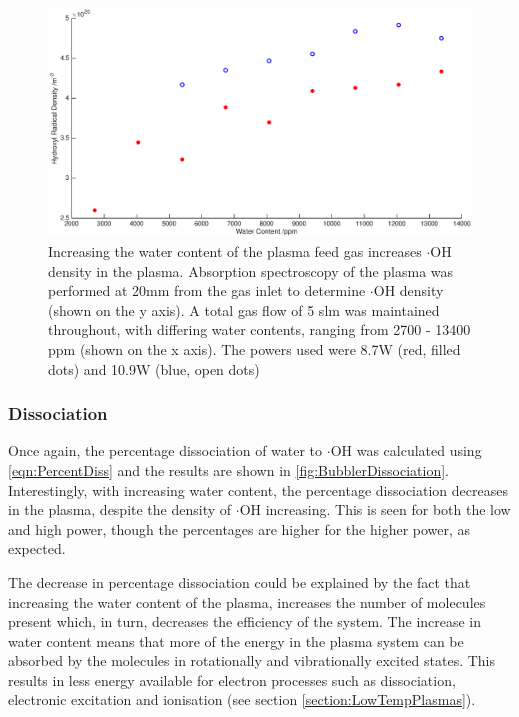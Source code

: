 \documentclass[11pt, oneside]{article}   	%
\begin{document}
\begin{figure}
    \centering
    \includegraphics[width=\textwidth]{Figures/BubblerVariation}
    \caption{Increasing the water content of the plasma feed gas increases $\cdot$OH density in the plasma. Absorption spectroscopy of the plasma was performed at 20mm from the gas inlet to determine $\cdot$OH density (shown on the y axis). A total gas flow of 5 slm was maintained throughout, with differing water contents, ranging from 2700 - 13400 ppm (shown on the x axis). The powers used were 8.7W (red, filled dots) and 10.9W (blue, open dots)}
    \label{fig:BubblerVariation}
\end{figure}


\subsubsection{Dissociation}

Once again, the percentage dissociation of water to $\cdot$OH was calculated using \ref{eqn:PercentDiss} and the results are shown in \ref{fig:BubblerDissociation}.
Interestingly, with increasing water content, the percentage dissociation decreases in the plasma, despite the density of $\cdot$OH increasing.
This is seen for both the low and high power, though the percentages are higher for the higher power, as expected.

The decrease in percentage dissociation could be explained by the fact that increasing the water content of the plasma, increases the number of molecules present which, in turn, decreases the efficiency of the system.
The increase in water content means that more of the energy in the plasma system can be absorbed by the molecules in rotationally and vibrationally excited states.
This results in less energy available for electron processes such as dissociation, electronic excitation and ionisation (see section \ref{section:LowTempPlasmas}).
\end{document}
